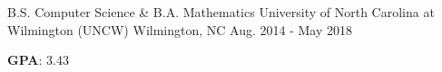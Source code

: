 

\begin{cventries}

  \cventry
    {B.S. Computer Science \& B.A. Mathematics} %
    {University of North Carolina at Wilmington (UNCW)} %
    {Wilmington, NC} %
    {Aug. 2014 - May 2018} %
    {
      \begin{cvitems}
        \item {\textbf{GPA}: 3.43}
      \end{cvitems}
    }
\end{cventries}
